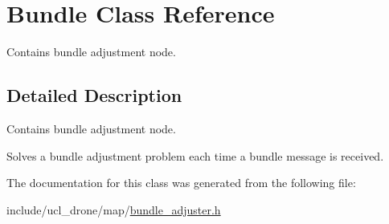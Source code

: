 \hypertarget{classBundle}{}\section{Bundle Class Reference}
\label{classBundle}


Contains bundle adjustment node.  




\subsection{Detailed Description}
Contains bundle adjustment node. 

Solves a bundle adjustment problem each time a bundle message is received. 

The documentation for this class was generated from the following file\+:\begin{DoxyCompactItemize}
\item 
include/ucl\+\_\+drone/map/\hyperlink{bundle__adjuster_8h}{bundle\+\_\+adjuster.\+h}\end{DoxyCompactItemize}
